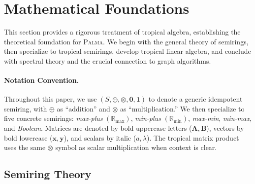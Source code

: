 \documentclass[11pt,a4paper]{article}
\theoremstyle{plain}
\theoremstyle{definition}
\newcommand{\palma}{\textsc{Palma}}
\newcommand{\Rmax}{\mathbb{R}_{\max}}
\newcommand{\Rmin}{\mathbb{R}_{\min}}
\newcommand{\mat}[1]{\mathbf{#1}}
\newcommand{\vect}[1]{\mathbf{#1}}
\begin{document}
\section{Mathematical Foundations}
\label{sec:background}

This section provides a rigorous treatment of tropical algebra, establishing the theoretical foundation for \palma{}. We begin with the general theory of semirings, then specialize to tropical semirings, develop tropical linear algebra, and conclude with spectral theory and the crucial connection to graph algorithms.

\paragraph{Notation Convention.}
Throughout this paper, we use $(S, \oplus, \otimes, \mathbf{0}, \mathbf{1})$ to denote a generic idempotent semiring, with $\oplus$ as ``addition'' and $\otimes$ as ``multiplication.'' We then specialize to five concrete semirings: \emph{max-plus} $(\Rmax)$, \emph{min-plus} $(\Rmin)$, \emph{max-min}, \emph{min-max}, and \emph{Boolean}. Matrices are denoted by bold uppercase letters ($\mat{A}, \mat{B}$), vectors by bold lowercase ($\vect{x}, \vect{y}$), and scalars by italic ($a, \lambda$). The tropical matrix product uses the same $\otimes$ symbol as scalar multiplication when context is clear.

\subsection{Semiring Theory}
\label{subsec:semirings}
\end{document}
